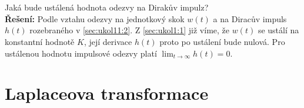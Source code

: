 \documentclass[twoside]{article}
\begin{document}
\subsection{~}
\label{sec:ukol1:3}
Jaká bude ustálená hodnota odezvy na Dirakův impulz? \\
\textbf{Řešení:} Podle vztahu odezvy na jednotkový skok $w(t)$ a na Diracův impuls $h(t)$ rozebraného v \ref{sec:ukol11:2}. Z \ref{sec:ukol1:1} již víme, že $w(t)$ se ustálí
na konstantní hodnotě $K$, její derivace $h(t)$ proto po ustálení bude nulová. Pro ustálenou hodnotu impulsové odezvy platí $\lim_{t \to \infty} h(t) = 0$.

\section{Laplaceova transformace}
\label{sec:ukol2}
\end{document}
